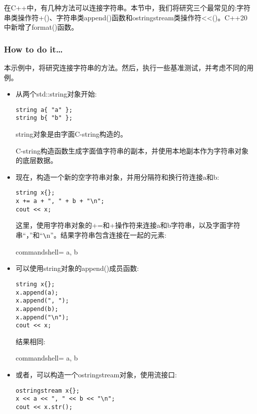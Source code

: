 
在C++中，有几种方法可以连接字符串。本节中，我们将研究三个最常见的:字符串类操作符+()、字符串类append()函数和ostringstream类操作符<{}<()。C++20中新增了format()函数。

\subsubsection{How to do it…}

本示例中，将研究连接字符串的方法。然后，执行一些基准测试，并考虑不同的用例。

\begin{itemize}
\item 
从两个std::string对象开始:

\begin{lstlisting}[style=styleCXX]
string a{ "a" };
string b{ "b" };
\end{lstlisting}

string对象是由字面C-string构造的。

C-string构造函数生成字面值字符串的副本，并使用本地副本作为字符串对象的底层数据。

\item 
现在，构造一个新的空字符串对象，并用分隔符和换行符连接a和b:

\begin{lstlisting}[style=styleCXX]
string x{};
x += a + ", " + b + "\n";
cout << x;
\end{lstlisting}

这里，使用字符串对象的+=和+操作符来连接a和b字符串，以及字面字符串“，”和“\verb|\|n”。结果字符串包含连接在一起的元素:

\begin{tcblisting}{commandshell={}}
a, b
\end{tcblisting}

\item 
可以使用string对象的append()成员函数:

\begin{lstlisting}[style=styleCXX]
string x{};
x.append(a);
x.append(", ");
x.append(b);
x.append("\n");
cout << x;
\end{lstlisting}

结果相同:

\begin{tcblisting}{commandshell={}}
a, b
\end{tcblisting}

\item 
或者，可以构造一个ostringstream对象，使用流接口:

\begin{lstlisting}[style=styleCXX]
ostringstream x{};
x << a << ", " << b << "\n";
cout << x.str();
\end{lstlisting}


\end{itemize}
